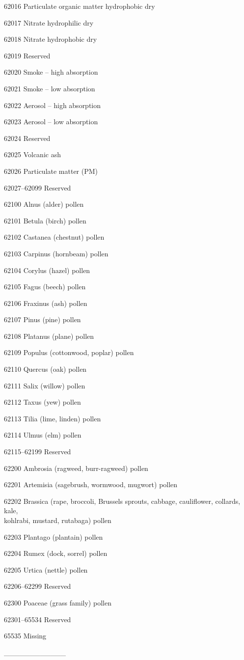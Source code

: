 62016 Particulate organic matter hydrophobic dry

62017 Nitrate hydrophilic dry

62018 Nitrate hydrophobic dry

62019 Reserved

62020 Smoke -- high absorption

62021 Smoke -- low absorption

62022 Aerosol -- high absorption

62023 Aerosol -- low absorption

62024 Reserved

62025 Volcanic ash

62026 Particulate matter (PM)

62027--62099 Reserved

62100 Alnus (alder) pollen

62101 Betula (birch) pollen

62102 Castanea (chestnut) pollen

62103 Carpinus (hornbeam) pollen

62104 Corylus (hazel) pollen

62105 Fagus (beech) pollen

62106 Fraxinus (ash) pollen

62107 Pinus (pine) pollen

62108 Platanus (plane) pollen

62109 Populus (cottonwood, poplar) pollen

62110 Quercus (oak) pollen

62111 Salix (willow) pollen

62112 Taxus (yew) pollen

62113 Tilia (lime, linden) pollen

62114 Ulmus (elm) pollen

62115--62199 Reserved

62200 Ambrosia (ragweed, burr-ragweed) pollen

62201 Artemisia (sagebrush, wormwood, mugwort) pollen

62202 Brassica (rape, broccoli, Brussels sprouts, cabbage, cauliflower, collards, kale,\\
kohlrabi, mustard, rutabaga) pollen

62203 Plantago (plantain) pollen

62204 Rumex (dock, sorrel) pollen

62205 Urtica (nettle) pollen

62206--62299 Reserved

62300 Poaceae (grass family) pollen

62301--65534 Reserved

65535 Missing

\_\_\_\_\_\_\_\_\_\_\_\_
